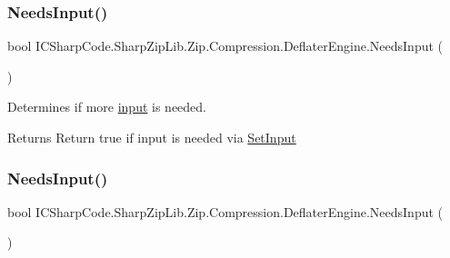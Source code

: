 \subsubsection{\texorpdfstring{Needs\+Input()}{NeedsInput()}\hspace{0.1cm}{\footnotesize\ttfamily [1/2]}}
{\footnotesize\ttfamily bool I\+C\+Sharp\+Code.\+Sharp\+Zip\+Lib.\+Zip.\+Compression.\+Deflater\+Engine.\+Needs\+Input (\begin{DoxyParamCaption}{ }\end{DoxyParamCaption})\hspace{0.3cm}{\ttfamily [inline]}}



Determines if more \hyperlink{class_i_c_sharp_code_1_1_sharp_zip_lib_1_1_zip_1_1_compression_1_1_deflater_engine_ab1fe3a452efc5e02b8ef7ff799d68fdf}{input} is needed. 

\begin{DoxyReturn}{Returns}
Return true if input is needed via \hyperlink{class_i_c_sharp_code_1_1_sharp_zip_lib_1_1_zip_1_1_compression_1_1_deflater_engine_ab1fe3a452efc5e02b8ef7ff799d68fdf}{Set\+Input}
\end{DoxyReturn}
\mbox{\label{class_i_c_sharp_code_1_1_sharp_zip_lib_1_1_zip_1_1_compression_1_1_deflater_engine_a475e9858378cc276c87dd412ba377e2d}} 
\subsubsection{\texorpdfstring{Needs\+Input()}{NeedsInput()}\hspace{0.1cm}{\footnotesize\ttfamily [2/2]}}
{\footnotesize\ttfamily bool I\+C\+Sharp\+Code.\+Sharp\+Zip\+Lib.\+Zip.\+Compression.\+Deflater\+Engine.\+Needs\+Input (\begin{DoxyParamCaption}{ }\end{DoxyParamCaption})\hspace{0.3cm}{\ttfamily [inline]}}



